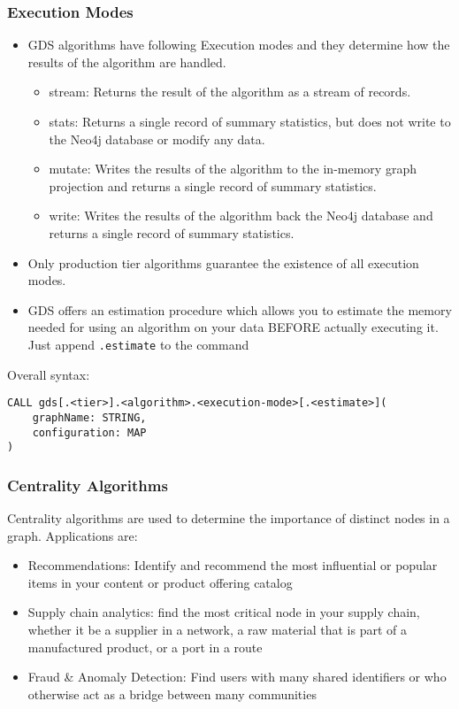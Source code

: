 \begin{frame}[fragile]\frametitle{Execution Modes}

\begin{itemize}
\item GDS algorithms have following Execution modes and they determine how the results of the algorithm are handled.
	\begin{itemize}
	\item stream: Returns the result of the algorithm as a stream of records.
	\item stats: Returns a single record of summary statistics, but does not write to the Neo4j database or modify any data.
	\item mutate: Writes the results of the algorithm to the in-memory graph projection and returns a single record of summary statistics.
	\item write: Writes the results of the algorithm back the Neo4j database and returns a single record of summary statistics.
	\end{itemize}
\item Only production tier algorithms guarantee the existence of all execution modes.
\item GDS offers an estimation procedure which allows you to estimate the memory needed for using an algorithm on your data BEFORE actually executing it. Just append \lstinline|.estimate| to the command
\end{itemize}


Overall syntax:

\begin{lstlisting}
CALL gds[.<tier>].<algorithm>.<execution-mode>[.<estimate>](
	graphName: STRING,
	configuration: MAP
)
\end{lstlisting}

\end{frame}



\begin{frame}[fragile]\frametitle{Centrality Algorithms}

 Centrality algorithms are used to determine the importance of distinct nodes in a graph. Applications are:
 
\begin{itemize}
\item Recommendations: Identify and recommend the most influential or popular items in your content or product offering catalog
\item Supply chain analytics: find the most critical node in your supply chain, whether it be a supplier in a network, a raw material that is part of a manufactured product, or a port in a route
\item Fraud \& Anomaly Detection: Find users with many shared identifiers or who otherwise act as a bridge between many communities
\end{itemize}


\end{frame}

